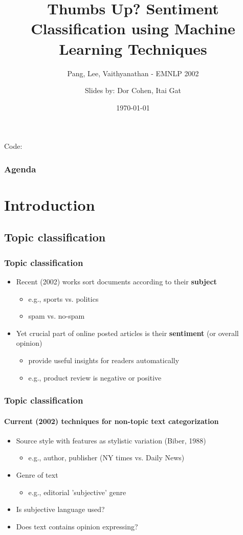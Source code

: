 \documentclass{beamer}
\title{Thumbs Up? Sentiment Classification using Machine Learning Techniques}
\subtitle{Pang, Lee, Vaithyanathan - EMNLP 2002}
\author{Slides by: Dor Cohen, Itai Gat}
\institute{IE @ Technion}
\date{\today}
\begin{document}
\begin{frame}
	\titlepage
	Code:
\end{frame}




\begin{frame}
	\frametitle{Agenda}
	\tableofcontents
\end{frame}

\section{Introduction}
\subsection{Topic classification}

\begin{frame}
	\frametitle{Topic classification}
	\begin{itemize}
	\item Recent (2002) works sort documents according to their \textbf{subject}
	\begin{itemize}
		\item e.g., sports vs. politics
		\item spam vs. no-spam
	\end{itemize}
	\pause
	\item Yet crucial part of online posted articles is their \textbf{sentiment} (or overall opinion)
	\begin{itemize}
		\item provide useful insights for readers automatically
		\item e.g., product review is negative or positive
	\end{itemize}

	\end{itemize}
\end{frame}

\begin{frame}
	\frametitle{Topic classification}
	\framesubtitle{Current (2002) techniques for non-topic text categorization}
	\begin{itemize}
		\item Source style with features as stylistic variation (Biber, 1988)
		\begin{itemize}
			\item e.g., author, publisher (NY times vs. Daily News)
		\end{itemize}
		\item Genre of text
		\begin{itemize}
			\item e.g., editorial 'subjective' genre
		\end{itemize}
		\item Is subjective language used?
		\item Does text contains opinion expressing?
	\end{itemize}
\end{frame}
\end{document}

